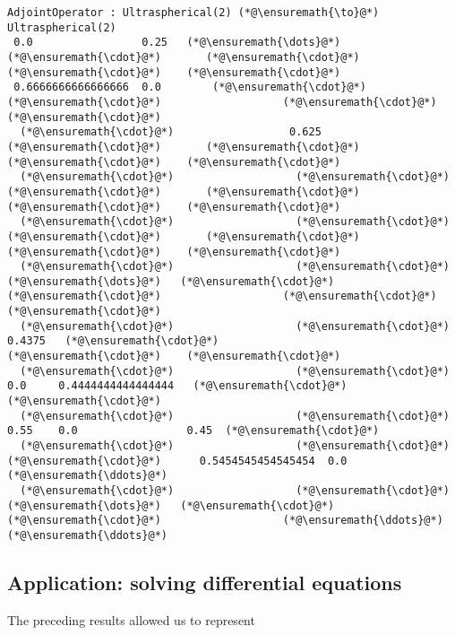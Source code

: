 \documentclass[12pt,a4paper]{article}
\begin{document}
\begin{lstlisting}
AdjointOperator : Ultraspherical(2) (*@\ensuremath{\to}@*) Ultraspherical(2)
 0.0                 0.25   (*@\ensuremath{\dots}@*)   (*@\ensuremath{\cdot}@*)       (*@\ensuremath{\cdot}@*)                   (*@\ensuremath{\cdot}@*)    (*@\ensuremath{\cdot}@*)
 0.6666666666666666  0.0        (*@\ensuremath{\cdot}@*)       (*@\ensuremath{\cdot}@*)                   (*@\ensuremath{\cdot}@*)    (*@\ensuremath{\cdot}@*)
  (*@\ensuremath{\cdot}@*)                  0.625      (*@\ensuremath{\cdot}@*)       (*@\ensuremath{\cdot}@*)                   (*@\ensuremath{\cdot}@*)    (*@\ensuremath{\cdot}@*)
  (*@\ensuremath{\cdot}@*)                   (*@\ensuremath{\cdot}@*)         (*@\ensuremath{\cdot}@*)       (*@\ensuremath{\cdot}@*)                   (*@\ensuremath{\cdot}@*)    (*@\ensuremath{\cdot}@*)
  (*@\ensuremath{\cdot}@*)                   (*@\ensuremath{\cdot}@*)         (*@\ensuremath{\cdot}@*)       (*@\ensuremath{\cdot}@*)                   (*@\ensuremath{\cdot}@*)    (*@\ensuremath{\cdot}@*)
  (*@\ensuremath{\cdot}@*)                   (*@\ensuremath{\cdot}@*)     (*@\ensuremath{\dots}@*)   (*@\ensuremath{\cdot}@*)       (*@\ensuremath{\cdot}@*)                   (*@\ensuremath{\cdot}@*)    (*@\ensuremath{\cdot}@*)
  (*@\ensuremath{\cdot}@*)                   (*@\ensuremath{\cdot}@*)        0.4375   (*@\ensuremath{\cdot}@*)                   (*@\ensuremath{\cdot}@*)    (*@\ensuremath{\cdot}@*)
  (*@\ensuremath{\cdot}@*)                   (*@\ensuremath{\cdot}@*)        0.0     0.4444444444444444   (*@\ensuremath{\cdot}@*)    (*@\ensuremath{\cdot}@*)
  (*@\ensuremath{\cdot}@*)                   (*@\ensuremath{\cdot}@*)        0.55    0.0                 0.45  (*@\ensuremath{\cdot}@*)
  (*@\ensuremath{\cdot}@*)                   (*@\ensuremath{\cdot}@*)         (*@\ensuremath{\cdot}@*)      0.5454545454545454  0.0   (*@\ensuremath{\ddots}@*)
  (*@\ensuremath{\cdot}@*)                   (*@\ensuremath{\cdot}@*)     (*@\ensuremath{\dots}@*)   (*@\ensuremath{\cdot}@*)       (*@\ensuremath{\cdot}@*)                   (*@\ensuremath{\ddots}@*)    (*@\ensuremath{\ddots}@*)
\end{lstlisting}



\subsection{Application: solving differential equations}
The preceding results allowed us to represent
\end{document}
